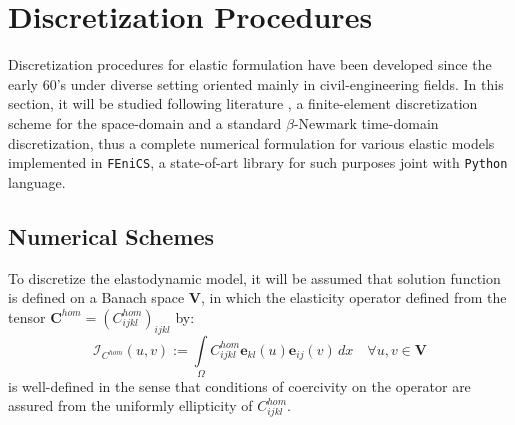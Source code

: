 \chapter{Discretization Procedures}

Discretization procedures for elastic formulation have been developed since the early $60$'s under diverse setting oriented mainly in civil-engineering fields. In this section, it will be studied following literature  \cite{ern2004theory}, \cite{raviart1983introduction} a finite-element discretization scheme for the space-domain and a standard $\beta$-Newmark time-domain discretization, thus a complete numerical formulation for various elastic models implemented in \texttt{FEniCS}, a state-of-art library for such purposes joint with \texttt{Python} language.

\section{Numerical Schemes}
To discretize the elastodynamic model, it will be assumed that solution function is defined on a Banach space $\mathbf{V}$, in which the elasticity operator defined from the tensor $\mathbf{C}^{hom} = (C^{hom}_{ijkl})_{ijkl}$ by:
\begin{equation*}
    \mathcal{I}_{C^{hom}} (u,v) := \int \limits_{\Omega} C^{hom}_{ijkl}\mathbf{e}_{kl}(u) \mathbf{e}_{ij}(v) \, dx \quad \forall u,v \in \mathbf{V}
\end{equation*}
is well-defined in the sense that conditions of coercivity on the operator are assured from the uniformly ellipticity of $C^{hom}_{ijkl}$.

